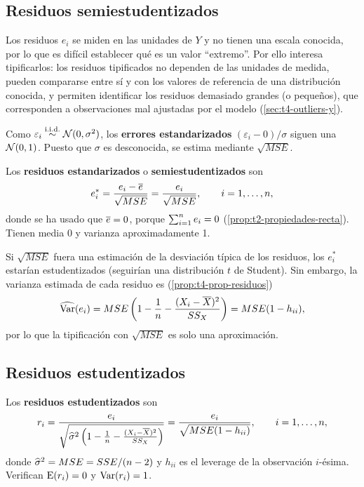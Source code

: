 \subsection{Residuos semiestudentizados}

Los residuos $e_i$ se miden en las unidades de $Y$ y no tienen una escala conocida, por lo que
es difícil establecer qué es un valor ``extremo''. Por ello interesa tipificarlos: los residuos
tipificados no dependen de las unidades de medida, pueden compararse entre sí y con los valores
de referencia de una distribución conocida, y permiten identificar los residuos demasiado
grandes (o pequeños), que corresponden a observaciones mal ajustadas por el modelo
(\cref{sec:t4-outliers-y}).

Como $\varepsilon_i\overset{\text{i.i.d.}}{\sim}\mathcal{N}(0,\sigma^2)$, los \textbf{errores estandarizados}
$(\varepsilon_i-0)/\sigma$ siguen una $\mathcal{N}(0,1)$. Puesto que $\sigma$ es desconocida, se estima
mediante $\sqrt{MSE}$.

\begin{definicion}
  Los \textbf{residuos estandarizados} o \textbf{semiestudentizados} son
  \[
    e_i^* = \frac{e_i-\overline{e}}{\sqrt{MSE}} = \frac{e_i}{\sqrt{MSE}}, \qquad i=1,\ldots,n,
  \]
  donde se ha usado que $\overline{e}=0$, porque $\sum_{i=1}^{n} e_i=0$ (\cref{prop:t2-propiedades-recta}).
  Tienen media 0 y varianza aproximadamente 1.
\end{definicion}

Si $\sqrt{MSE}$ fuera una estimación de la desviación típica de los residuos, los $e_i^*$ estarían
estudentizados (seguirían una distribución $t$ de Student). Sin embargo, la varianza estimada de
cada residuo es (\cref{prop:t4-prop-residuos})
\[
  \widehat{\operatorname{Var}}(e_i) = MSE\left(1-\frac1n-\frac{(X_i-\overline{X})^2}{SS_X}\right) = MSE(1-h_{ii}),
\]
por lo que la tipificación con $\sqrt{MSE}$ es solo una aproximación.

\subsection{Residuos estudentizados}

\begin{definicion}
  Los \textbf{residuos estudentizados} son
  \[
    r_i = \frac{e_i}{\sqrt{\widehat{\sigma}^2\left(1-\frac1n-\frac{(X_i-\overline{X})^2}{SS_X}\right)}}
    = \frac{e_i}{\sqrt{MSE(1-h_{ii})}}, \qquad i=1,\ldots,n,
  \]
  donde $\widehat{\sigma}^2=MSE=SSE/(n-2)$ y $h_{ii}$ es el leverage de la observación $i$-ésima.
  Verifican $\operatorname{E}(r_i)=0$ y $\operatorname{Var}(r_i)=1$.
\end{definicion}

